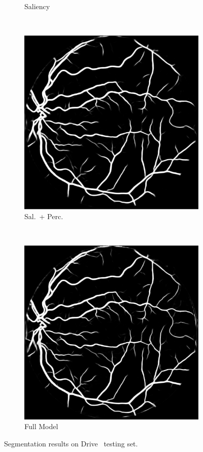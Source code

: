 \documentclass{scrartcl}
\begin{document}
\begin{figure}[bt]
{\begin{subfigure}{0.2\textwidth}
    \caption{Saliency}
\end{subfigure}~
\begin{subfigure}{0.2\textwidth}
\centering
    \includegraphics[width=1.0\textwidth]{segmentation_nogan}
    \caption{Sal.\ + Perc.}
\end{subfigure}~
\begin{subfigure}{0.2\textwidth}
\centering
    \includegraphics[width=1.0\textwidth]{segmentation_gan}
    \caption{Full Model}
\end{subfigure}
}
\caption{Segmentation results on Drive~\cite{Drive} testing set.}
\label{fig:segmentation-example}
\end{figure}
\end{document}

